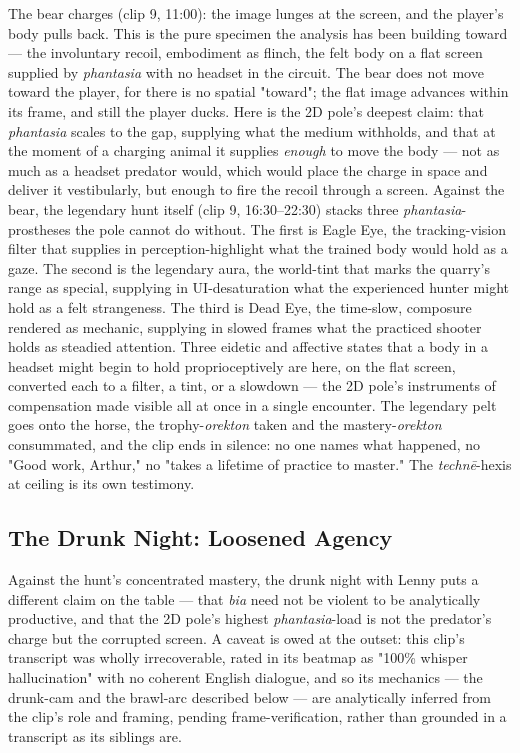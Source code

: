 \documentclass{article}
\begin{document}
The bear charges (clip 9, 11:00): the image lunges at the screen, and the player's body pulls back. This is the pure specimen the analysis has been building toward — the involuntary recoil, embodiment as flinch, the felt body on a flat screen supplied by \textit{phantasia} with no headset in the circuit. The bear does not move toward the player, for there is no spatial "toward"; the flat image advances within its frame, and still the player ducks. Here is the 2D pole's deepest claim: that \textit{phantasia} scales to the gap, supplying what the medium withholds, and that at the moment of a charging animal it supplies \textit{enough} to move the body — not as much as a headset predator would, which would place the charge in space and deliver it vestibularly, but enough to fire the recoil through a screen. Against the bear, the legendary hunt itself (clip 9, 16:30–22:30) stacks three \textit{phantasia}-prostheses the pole cannot do without. The first is Eagle Eye, the tracking-vision filter that supplies in perception-highlight what the trained body would hold as a gaze. The second is the legendary aura, the world-tint that marks the quarry's range as special, supplying in UI-desaturation what the experienced hunter might hold as a felt strangeness. The third is Dead Eye, the time-slow, composure rendered as mechanic, supplying in slowed frames what the practiced shooter holds as steadied attention. Three eidetic and affective states that a body in a headset might begin to hold proprioceptively are here, on the flat screen, converted each to a filter, a tint, or a slowdown — the 2D pole's instruments of compensation made visible all at once in a single encounter. The legendary pelt goes onto the horse, the trophy-\textit{orekton} taken and the mastery-\textit{orekton} consummated, and the clip ends in silence: no one names what happened, no "Good work, Arthur," no "takes a lifetime of practice to master." The \textit{technē}-hexis at ceiling is its own testimony.

\bigskip

\subsection*{The Drunk Night: Loosened Agency}

Against the hunt's concentrated mastery, the drunk night with Lenny puts a different claim on the table — that \textit{bia} need not be violent to be analytically productive, and that the 2D pole's highest \textit{phantasia}-load is not the predator's charge but the corrupted screen. A caveat is owed at the outset: this clip's transcript was wholly irrecoverable, rated in its beatmap as "100\% whisper hallucination" with no coherent English dialogue, and so its mechanics — the drunk-cam and the brawl-arc described below — are analytically inferred from the clip's role and framing, pending frame-verification, rather than grounded in a transcript as its siblings are.
\end{document}

